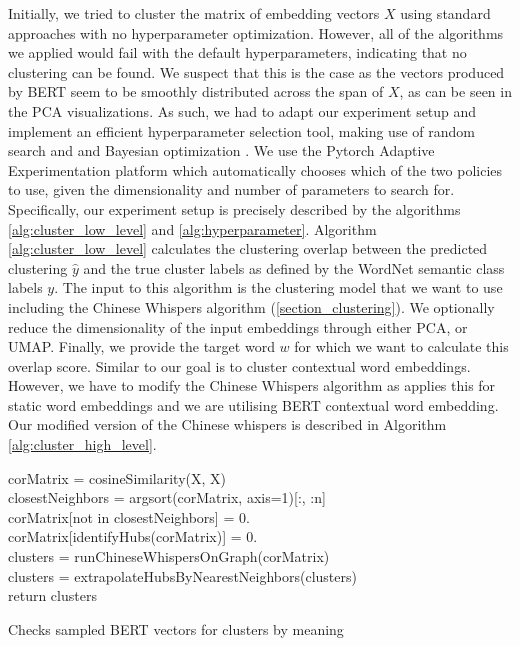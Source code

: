 \documentclass[a4paper,12pt,oneside,openright]{report}
\begin{document}
Initially, we tried to cluster the matrix of embedding vectors $X$ using standard approaches with no hyperparameter optimization. 
However, all of the algorithms we applied would fail with the default hyperparameters, indicating that no clustering can be found.
We suspect that this is the case as the vectors produced by BERT seem to be smoothly distributed across the span of $X$, as can be seen in the PCA visualizations. 
As such, we had to adapt our experiment setup and implement an efficient hyperparameter selection tool, making use of random search and \cite{bergstra12} and Bayesian optimization \cite{wang13}.
We use the Pytorch Adaptive Experimentation platform \cite{pyax} which automatically chooses which of the two policies to use, given the dimensionality and number of parameters to search for.
Specifically, our experiment setup is precisely described by the algorithms \ref{alg:cluster_low_level} and \ref{alg:hyperparameter}.
Algorithm \ref{alg:cluster_low_level} calculates the clustering overlap between the predicted clustering $\hat{y}$ and the true cluster labels as defined by the WordNet semantic class labels $y$.
The input to this algorithm is the clustering model that we want to use including the Chinese Whispers algorithm (\ref{section_clustering}). 
We optionally reduce the dimensionality of the input embeddings through either PCA, or UMAP.
Finally, we provide the target word $w$ for which we want to calculate this overlap score. 
Similar to \cite{pelevina16} our goal is to cluster contextual word embeddings.
However, we have to modify the Chinese Whispers algorithm as \cite{pelevina16} applies this for static word embeddings and we are utilising BERT contextual word embedding.
Our modified version of the Chinese whispers is described in Algorithm \ref{alg:cluster_high_level}. \\

\begin{algorithm}[H]
\SetAlgoLined
{}

corMatrix = cosineSimilarity(X, X) \\
closestNeighbors = argsort(corMatrix, axis=1)[:, :n] \\
corMatrix[not in closestNeighbors] = 0. \\

corMatrix[identifyHubs(corMatrix)] = 0. \\

clusters = runChineseWhispersOnGraph(corMatrix) \\

clusters = extrapolateHubsByNearestNeighbors(clusters) \\

return clusters

 \label{alg:cluster_high_level}
 \caption{Checks sampled BERT vectors for clusters by  meaning}
\end{algorithm}
\end{document}
